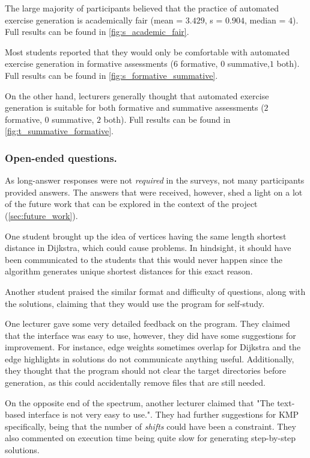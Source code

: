 \documentclass{l4proj}
\begin{document}
The large majority of participants believed that the practice of automated exercise generation is academically fair (mean = $3.429$, s = $0.904$, median = $4$). Full results can be found in \autoref{fig:s_academic_fair}.

Most students reported that they would only be comfortable with automated exercise generation in formative assessments ($6$ formative, $0$ summative,$1$ both).  Full results can be found in \autoref{fig:s_formative_summative}.

On the other hand, lecturers generally thought that automated exercise generation is suitable for both formative and summative assessments ($2$ formative, $0$ summative, $2$ both).  Full results can be found in \autoref{fig:t_summative_formative}.

\subsubsection{Open-ended questions.}

As long-answer responses were not \emph{required} in the surveys, not many participants provided answers. The answers that were received, however, shed a light on a lot of the future work that can be explored in the context of the project (\autoref{sec:future_work}).

One student brought up the idea of vertices having the same length shortest distance in Dijkstra, which could cause problems. In hindsight, it should have been communicated to the students that this would never happen since the algorithm generates unique shortest distances for this exact reason. 

Another student praised the similar format and difficulty of questions, along with the solutions, claiming that they would use the program for self-study.

One lecturer gave some very detailed feedback on the program. They claimed that the interface was easy to use, however, they did have some suggestions for improvement. For instance, edge weights sometimes overlap for Dijkstra and the edge highlights in solutions do not communicate anything useful. Additionally, they thought that the program should not clear the target directories before generation, as this could accidentally remove files that are still needed.

On the opposite end of the spectrum, another lecturer claimed that "The text-based interface is not very easy to use.". They had further suggestions for KMP specifically, being that the number of \emph{shifts} could have been a constraint. They also commented on execution time being quite slow for generating step-by-step solutions.
\end{document}
